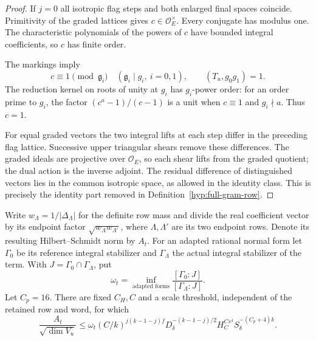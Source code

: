 \begin{proof}
If \(j=0\) all isotropic flag steps and both enlarged final spaces coincide. Primitivity of the graded lattices gives \(c\in\mathcal O_E^\times\). Every conjugate has modulus one. The characteristic polynomials of the powers of \(c\) have bounded integral coefficients, so \(c\) has finite order. 

The markings imply
\[
     c\equiv1\pmod {\mathfrak g_i}\quad(\mathfrak g_i\mid g_i,\ i=0,1),
     \qquad (T_u,g_0g_1)=1 .
\] The reduction kernel on roots of unity at \(g_i\) has \(g_i\)-power order: for an order prime to \(g_i\), the factor \((c^a-1)/(c-1)\) is a unit when \(c\equiv1\) and \(g_i\nmid a\). Thus \(c=1\).

For equal graded vectors the two integral lifts at each step differ in the preceding flag lattice. Successive upper triangular shears remove these differences. The graded ideals are projective over \(\mathcal O_E\), so each shear lifts from the graded quotient; the dual action is the inverse adjoint. The residual difference of distinguished vectors lies in the common isotropic space, as allowed in the identity class. This is precisely the identity part removed in Definition~\ref{hyp:full-gram-row}.
\end{proof}

\begin{auxlemma}\label{lem:zero-gram-fixed-label}
Write \(w_\Lambda=1/|\Delta_\Lambda|\) for the definite row mass and divide the real coefficient vector by its endpoint factor \(\sqrt{w_\Lambda w_{\Lambda'}}\), where \(\Lambda,\Lambda'\) are its two endpoint rows. Denote its resulting Hilbert--Schmidt norm by \(A_t\). For an adapted rational normal form let \(\Gamma_0\) be its reference integral stabilizer and \(\Gamma_\Lambda\) the actual integral stabilizer of the term. With \(J=\Gamma_0\cap\Gamma_\Lambda\), put
\[
 \omega_t=\inf_{\text{adapted forms}}
          \frac{[\Gamma_0:J]}{[\Gamma_\Lambda:J]} .
\]
Let \(C_p=16\). There are fixed \(C_H,C\) and a scale threshold, independent of the retained row and word, for which
\begin{equation}\label{eq:zero-gram-angular-gain}
 \frac{A_t}{\sqrt{\dim V_u}}\le
 \omega_t (C/k)^{j(k-1-j)f}
       D_\delta^{-(k-1-j)/2} H_C^{Cs^4}
                    S_\delta^{-(C_p+4)k}.
\end{equation}
\end{auxlemma}

